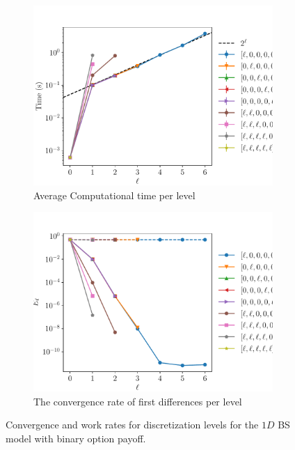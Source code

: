 \documentclass[11pt]{article}
\begin{document}
\begin{figure}[!h]
	\centering
	\begin{subfigure}{.5\textwidth}
		\centering
		\includegraphics[width=0.95\linewidth]{./figures/binary_8_steps/level_work.pdf}
		\caption{Average Computational time per level}
		\label{fig:misc_binary_8_steps_sub3}
	\end{subfigure}%
	\begin{subfigure}{.5\textwidth}
		\centering
		\includegraphics[width=0.95\linewidth]{./figures/binary_8_steps/levels_error_rate.pdf}
		\caption{ The convergence rate of first differences per level}
		\label{fig:misc_binary_8_steps_sub4}
	\end{subfigure}%
	\caption{Convergence and work rates for discretization levels for the $1D$ BS model with binary option payoff.}
	\label{fig:misc_binary_8_steps_2}
\end{figure}
\end{document}
